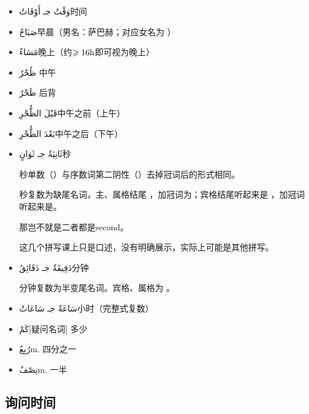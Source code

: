 \begin{itemize}
    \item \ac{وَقْتٌ جـ أَوْقَاتٌ}{时间}
    \item \ac{صَبَاحٌ}{早晨（男名：萨巴赫；对应女名为 ）}
    \item \ac{مَسَاءٌ}{晚上（约$\geqslant16\rm h$即可视为晚上）}
    \item \ac{ظُحْرٌ }{中午}
    \item \ac{ظَحْرٌ }{后背}
    \item \ac{قَبْلَ الظُّحْرِ}{中午之前（上午）}
    \item \ac{بَعْدَ الظُّحْرِ}{中午之后（下午）}
    \item \ac{ثَانِيَةٌ جـ ثَوَانٍ}{秒}
    
        \begin{attention}
            秒单数（）与序数词第二阴性（）去掉冠词后的形式相同\red{$^*$}。

            秒复数为缺尾名词，主、属格结尾  ，加冠词为；宾格结尾听起来是 ，加冠词听起来是\red{$^\dagger$}。
        \end{attention}

        \begin{note}
            \red{$^*$}那岂不就是二者都是second。

            \red{$^\dagger$} 这几个拼写课上只是口述，没有明确展示，实际上可能是其他拼写。
        \end{note}
    \item \ac{دَقِيقَةٌ جـ دَقَائِقُ}{分钟}
    
        \begin{attention}
            分钟复数为半变尾名词。宾格、属格为  。
        \end{attention}
    \item \ac{سَاعَةٌ جـ سَاعَاتٌ}{小时（完整式复数）}
    \item \ac{كَمْ}{[疑问名词] 多少}
    \item \ac{رُبِعٌ}{m. 四分之一}
    \item \ac{نِصْفٌ}{m. 一半}
\end{itemize}

\subsection{询问时间}

